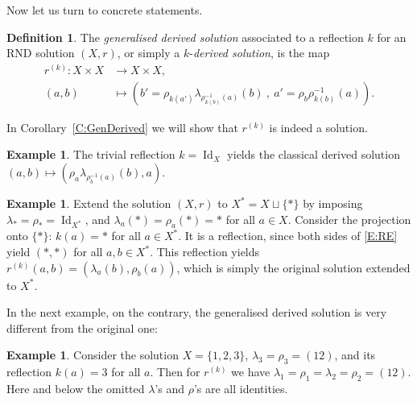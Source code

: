 \documentclass{amsart}
\newcommand{\Id}{\operatorname{Id}}
\theoremstyle{plain}
\theoremstyle{definition}
\newtheorem{defn}[thm]{Definition}
\newtheorem{exa}[thm]{Example}
\theoremstyle{remark}
\begin{document}
Now let us turn to concrete statements.

\begin{defn}\label{D:k-sol}
The \emph{generalised derived solution} associated to a reflection $k$ for an RND solution $(X,r)$, or simply a $k$-\emph{derived solution}, is the map
\begin{align*}
r^{(k)} \colon X \times X &\longrightarrow X \times X,\\
(a,b) &\longmapsto (b'= \rho_{k(a')}\lambda_{\rho_{k(b)}^{-1}(a)}(b)\ ,\ a'=  \rho_b\rho_{k(b)}^{-1}(a)).
\end{align*}
\end{defn}

In Corollary~\ref{C:GenDerived} we will show that $r^{(k)}$ is indeed a solution.

\begin{exa}\label{EX:derived}
The trivial reflection $k=\Id_X$ yields the classical derived solution $(a,b) \longmapsto (\rho_a \lambda_{\rho_{b}^{-1}(a)}(b),a)$.
\end{exa}

\begin{exa}\label{EX:original}
Extend the solution $(X,r)$ to $X^*=X \sqcup \{*\}$ by imposing $\lambda_*=\rho_*=\Id_{X^*}$, and $\lambda_a(*)=\rho_a(*)=*$ for all $a \in X$. Consider the projection onto $\{*\}$: $k(a)=*$ for all $a \in X^*$. It is a reflection, since both sides of \eqref{E:RE} yield $(*,*)$ for all $a,b \in X^*$. This reflection yields $r^{(k)}(a,b)=(\lambda_a(b),\rho_b(a))$, which is simply the original solution extended to $X^*$.
\end{exa}

In the next example, on the contrary, the generalised derived solution is very different from the original one:
\begin{exa}\label{EX:3}
Consider the solution $X=\{1,2,3\}$, $\lambda_3=\rho_3=(12)$, and its reflection $k(a)=3$ for all $a$. Then for $r^{(k)}$ we have $\lambda_1=\rho_1=\lambda_2=\rho_2=(12)$. Here and below the omitted $\lambda$'s and $\rho$'s are all identities.
\end{exa}
\end{document}
